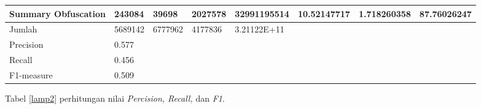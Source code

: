 \documentclass[../Proposal.tex]{subfiles}
\begin{document}
\begin{table}[H]
{\begin{tabular}{|l|l|llllll}
			Summary Obfuscation                         & 243084                  & \multicolumn{1}{l|}{39698}   & \multicolumn{1}{l|}{2027578} & \multicolumn{1}{l|}{32991195514} & \multicolumn{1}{l|}{10.52147717} & \multicolumn{1}{l|}{1.718260358} & \multicolumn{1}{l|}{87.76026247} \\ \hline
			Jumlah                                      & 5689142                 & \multicolumn{1}{l|}{6777962} & \multicolumn{1}{l|}{4177836} & \multicolumn{1}{l|}{3.21122E+11} &                                  &                                  &                                  \\ \cline{1-5}
			Precision                                   & 0.577                   &                              &                              &                                  &                                  &                                  &                                  \\ \cline{1-2}
			Recall                                      & 0.456                   &                              &                              &                                  &                                  &                                  &                                  \\ \cline{1-2}
			F1-measure                                  & 0.509                   &                              &                              &                                  &                                  &                                  &                                  \\ \cline{1-2}
		\end{tabular}
	}
	\end{table}

	\noindent Tabel \ref{lamp2} perhitungan nilai \textit{Percision, Recall,} dan \textit{F1}.
	
\end{document}
